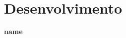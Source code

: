 \section{Desenvolvimento}
\begin{frame}

		
\end{frame}
\begin{frame}


\textbf{\Large name}\\
\end{frame}
\begin{frame}


\end{frame}
